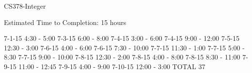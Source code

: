 C\-S378-\/\-Integer

Estimated Time to Completion\-: 15 hours

7-\/1-\/15 4\-:30 -\/ 5\-:00 7-\/3-\/15 6\-:00 -\/ 8\-:00 7-\/4-\/15 3\-:00 -\/ 6\-:00 7-\/4-\/15 9\-:00 -\/ 12\-:00 7-\/5-\/15 12\-:30 -\/ 3\-:00 7-\/6-\/15 4\-:00 -\/ 6\-:00 7-\/6-\/15 7\-:30 -\/ 10\-:00 7-\/7-\/15 11\-:30 -\/ 1\-:00 7-\/7-\/15 5\-:00 -\/ 8\-:30 7-\/7-\/15 9\-:00 -\/ 10\-:00 7-\/8-\/15 12\-:30 -\/ 2\-:00 7-\/8-\/15 4\-:00 -\/ 8\-:00 7-\/8-\/15 8\-:30 -\/ 11\-:00 7-\/9-\/15 11\-:00 -\/ 12\-:45 7-\/9-\/15 4\-:00 -\/ 9\-:00 7-\/10-\/15 12\-:00 -\/ 3\-:00 T\-O\-T\-A\-L 37 